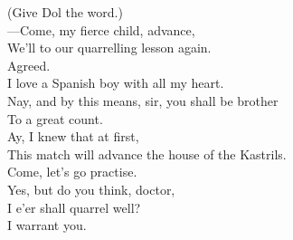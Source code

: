 \documentclass[a4paper,oneside,12pt]{memoir}
\begin{document}
\begin{drama*}
\subtlespeaks (Give Dol the word.)\\
 ---Come, my fierce child, advance,\\
We'll to our quarrelling lesson again.\\
\kastrilspeaks {} Agreed.\\
I love a Spanish boy with all my heart.\\
\subtlespeaks Nay, and by this means, sir, you shall be brother\\
To a great count.\\
\kastrilspeaks {} Ay, I knew that at first,\\
This match will advance the house of the Kastrils.\\
\subtlespeaks Come, let's go practise.\\
\kastrilspeaks {} Yes, but do you think, doctor,\\
I e'er shall quarrel well?\\
\subtlespeaks {} I warrant you.\\
\scene


\end{drama*}
\end{document}
